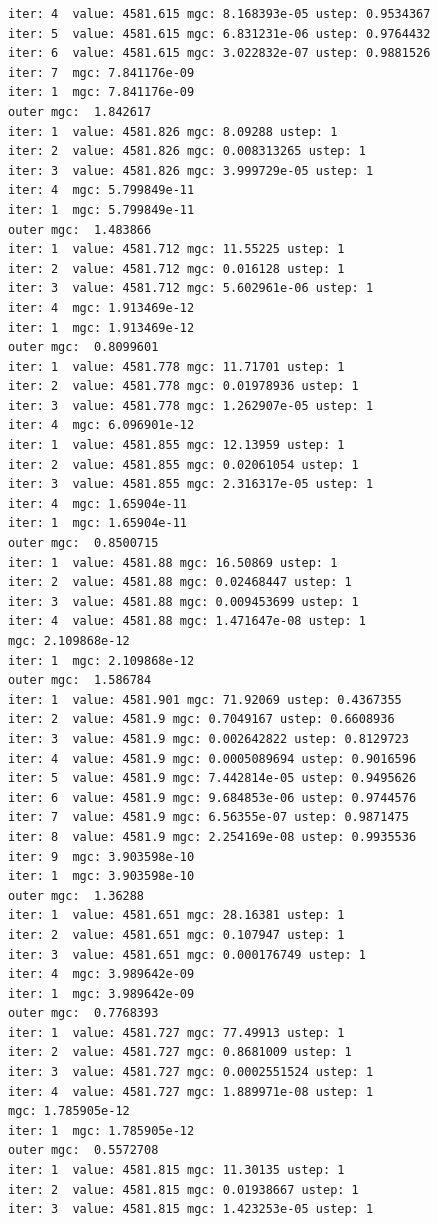 \documentclass[
  letterpaper,
  DIV=11,
  numbers=noendperiod]{scrartcl}
\begin{document}
\begin{verbatim}
iter: 4  value: 4581.615 mgc: 8.168393e-05 ustep: 0.9534367 
iter: 5  value: 4581.615 mgc: 6.831231e-06 ustep: 0.9764432 
iter: 6  value: 4581.615 mgc: 3.022832e-07 ustep: 0.9881526 
iter: 7  mgc: 7.841176e-09 
iter: 1  mgc: 7.841176e-09 
outer mgc:  1.842617 
iter: 1  value: 4581.826 mgc: 8.09288 ustep: 1 
iter: 2  value: 4581.826 mgc: 0.008313265 ustep: 1 
iter: 3  value: 4581.826 mgc: 3.999729e-05 ustep: 1 
iter: 4  mgc: 5.799849e-11 
iter: 1  mgc: 5.799849e-11 
outer mgc:  1.483866 
iter: 1  value: 4581.712 mgc: 11.55225 ustep: 1 
iter: 2  value: 4581.712 mgc: 0.016128 ustep: 1 
iter: 3  value: 4581.712 mgc: 5.602961e-06 ustep: 1 
iter: 4  mgc: 1.913469e-12 
iter: 1  mgc: 1.913469e-12 
outer mgc:  0.8099601 
iter: 1  value: 4581.778 mgc: 11.71701 ustep: 1 
iter: 2  value: 4581.778 mgc: 0.01978936 ustep: 1 
iter: 3  value: 4581.778 mgc: 1.262907e-05 ustep: 1 
iter: 4  mgc: 6.096901e-12 
iter: 1  value: 4581.855 mgc: 12.13959 ustep: 1 
iter: 2  value: 4581.855 mgc: 0.02061054 ustep: 1 
iter: 3  value: 4581.855 mgc: 2.316317e-05 ustep: 1 
iter: 4  mgc: 1.65904e-11 
iter: 1  mgc: 1.65904e-11 
outer mgc:  0.8500715 
iter: 1  value: 4581.88 mgc: 16.50869 ustep: 1 
iter: 2  value: 4581.88 mgc: 0.02468447 ustep: 1 
iter: 3  value: 4581.88 mgc: 0.009453699 ustep: 1 
iter: 4  value: 4581.88 mgc: 1.471647e-08 ustep: 1 
mgc: 2.109868e-12 
iter: 1  mgc: 2.109868e-12 
outer mgc:  1.586784 
iter: 1  value: 4581.901 mgc: 71.92069 ustep: 0.4367355 
iter: 2  value: 4581.9 mgc: 0.7049167 ustep: 0.6608936 
iter: 3  value: 4581.9 mgc: 0.002642822 ustep: 0.8129723 
iter: 4  value: 4581.9 mgc: 0.0005089694 ustep: 0.9016596 
iter: 5  value: 4581.9 mgc: 7.442814e-05 ustep: 0.9495626 
iter: 6  value: 4581.9 mgc: 9.684853e-06 ustep: 0.9744576 
iter: 7  value: 4581.9 mgc: 6.56355e-07 ustep: 0.9871475 
iter: 8  value: 4581.9 mgc: 2.254169e-08 ustep: 0.9935536 
iter: 9  mgc: 3.903598e-10 
iter: 1  mgc: 3.903598e-10 
outer mgc:  1.36288 
iter: 1  value: 4581.651 mgc: 28.16381 ustep: 1 
iter: 2  value: 4581.651 mgc: 0.107947 ustep: 1 
iter: 3  value: 4581.651 mgc: 0.000176749 ustep: 1 
iter: 4  mgc: 3.989642e-09 
iter: 1  mgc: 3.989642e-09 
outer mgc:  0.7768393 
iter: 1  value: 4581.727 mgc: 77.49913 ustep: 1 
iter: 2  value: 4581.727 mgc: 0.8681009 ustep: 1 
iter: 3  value: 4581.727 mgc: 0.0002551524 ustep: 1 
iter: 4  value: 4581.727 mgc: 1.889971e-08 ustep: 1 
mgc: 1.785905e-12 
iter: 1  mgc: 1.785905e-12 
outer mgc:  0.5572708 
iter: 1  value: 4581.815 mgc: 11.30135 ustep: 1 
iter: 2  value: 4581.815 mgc: 0.01938667 ustep: 1 
iter: 3  value: 4581.815 mgc: 1.423253e-05 ustep: 1 

\end{verbatim}
\end{document}
